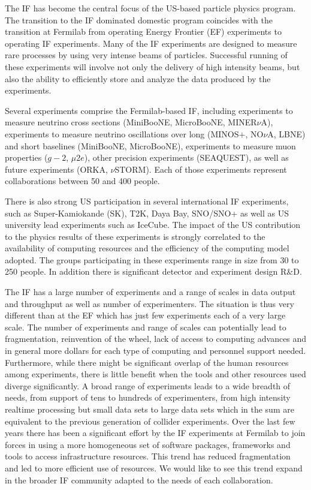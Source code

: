 The IF has become the central focus of the US-based particle physics program.  The transition to the IF dominated domestic program coincides with the transition at Fermilab from operating Energy Frontier (EF) experiments to operating IF experiments.  Many of the IF experiments are designed to measure rare processes by using very intense beams of particles.  Successful running of these experiments will involve not only the delivery of high intensity beams, but also the ability to efficiently store and analyze the data produced by the experiments. 

Several experiments comprise the Fermilab-based IF, including experiments to measure neutrino cross sections (MiniBooNE, MicroBooNE, MINER$\nu$A), experiments to measure neutrino oscillations over long (MINOS$+$, NO$\nu$A, LBNE) and short baselines (MiniBooNE, MicroBooNE), experiments to measure muon properties ($g-2$, $\mu2e$), other precision experiments (SEAQUEST), as well as future experiments (ORKA, $\nu$STORM).  Each of those experiments represent collaborations between 50 and 400 people.

There is also strong US participation in several international IF experiments, such as Super-Kamiokande (SK), T2K, Daya Bay, SNO/SNO+ as well as US university lead experiments such as IceCube. The impact of the US contribution to the physics results of these experiments is strongly correlated to the availability of computing resources and the efficiency of the computing model adopted. The groups participating in these experiments range in size from 30 to 250 people. In addition there is significant detector and experiment design R\&D. 

The IF has a large number of experiments and a range of scales in data output and throughput as well as number of experimenters. The situation is thus very different than at the EF which has just few experiments each of a very large scale. The number of experiments and range of scales can potentially lead to fragmentation, reinvention of the wheel, lack of access to computing advances and in general more dollars for each type of computing and personnel support needed. Furthermore, while there might be significant overlap of the human resources among experiments, there is little benefit when the tools and other resources used diverge significantly. A broad range of experiments leads to a wide breadth of needs, from support of tens to hundreds of experimenters, from high intensity realtime processing but small data sets to large data sets which in the sum are equivalent to the previous generation of collider experiments. Over the last few years there has been a significant effort by the IF experiments at Fermilab to join forces in using a more homogeneous set of software packages, frameworks and tools to access infrastructure resources. This trend has reduced fragmentation and led to more efficient use of resources. We would like to see this trend expand in the broader IF community adapted to the needs of each collaboration. 

